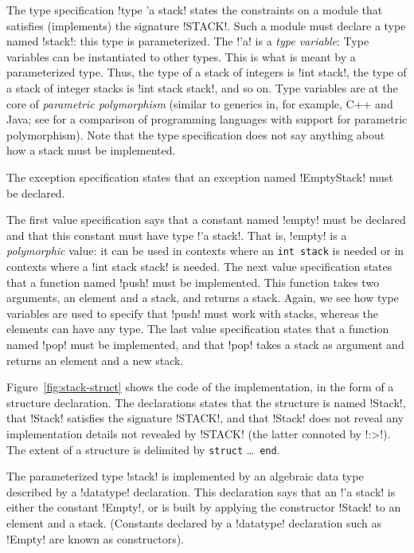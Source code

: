 \documentclass[finalversion]{usetex-v1}
\begin{document}
The type specification !type 'a stack! states the
constraints on a module that
satisfies (implements) the signature !STACK!. Such a module must declare a type named
!stack!: this type is parameterized.  The !'a! is a \emph{type
  variable}: Type
variables can be instantiated to other types. This is what
is meant by a parameterized type.    Thus, the type of a
stack of integers is !int stack!, the type of a stack of integer
stacks is !int stack stack!, and so on. Type variables are at the core of
\emph{parametric polymorphism} (similar to generics in, for
example, C++ and Java; see \cite{garcia03:generics} for a comparison
of programming languages with support for parametric polymorphism).
Note that the type specification does not say anything about how a stack must be
implemented.

The exception specification states that an exception named
!EmptyStack! must be declared.

The first value specification says that a constant named !empty! must
be declared and that this constant must have type !'a stack!.  That
is, !empty! is a \emph{polymorphic} value: it can be used in contexts
where an \texttt{int stack} is needed or in contexts where a
!int stack stack! is needed.  The next value specification states that a
function named !push! must be implemented.  This function
takes two arguments, an element and a stack, and returns a stack.
Again, we see how type variables are used to specify that !push! must
work with stacks, whereas the elements can have any type.  The last value
specification states that a function named !pop! must be implemented,
and that !pop!  takes a stack as argument and returns an element and a
new stack.

Figure~\ref{fig:stack-struct} shows the code of the
implementation, in the form of a
structure declaration.  The declarations states
that the structure is named !Stack!, that !Stack! satisfies the
signature !STACK!, and that !Stack! does not reveal any implementation
details not revealed by !STACK! (the latter connoted by !:>!).  The
extent of a structure is delimited by \texttt{struct} \ldots\ 
\texttt{end}.

The parameterized type !stack! is implemented by an algebraic data
type described by a !datatype! declaration.  This declaration says that
an !'a stack! is either the constant !Empty!, or is built by
applying the constructor !Stack! to an element and a stack. (Constants
declared by a !datatype! declaration such as !Empty! are
known as constructors).
\end{document}

